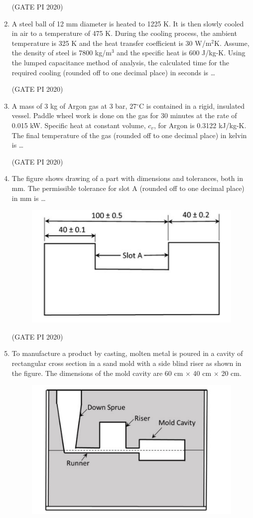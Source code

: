 \documentclass[journal,12pt,onecolumn]{IEEEtran}
\theoremstyle{remark}
\begin{document}
\begin{enumerate}
\hfill (GATE PI 2020)

\item A steel ball of 12 mm diameter is heated to 1225 K. It is then slowly cooled in air to a temperature of 475 K. During the cooling process, the ambient temperature is 325 K and the heat transfer coefficient is 30 W/m$^2$K. Assume, the density of steel is 7800 kg/m$^3$ and the specific heat is 600 J/kg-K. Using the lumped capacitance method of analysis, the calculated time for the required cooling (rounded off to one decimal place) in seconds is \dots 

\hfill (GATE PI 2020)

\item A mass of 3 kg of Argon gas at 3 bar, 27$^\circ$C is contained in a rigid, insulated vessel. Paddle wheel work is done on the gas for 30 minutes at the rate of 0.015 kW. Specific heat at constant volume, $c_v$, for Argon is 0.3122 kJ/kg-K. The final temperature of the gas (rounded off to one decimal place) in kelvin is \dots 

\hfill (GATE PI 2020)

\item The figure shows drawing of a part with dimensions and tolerances, both in mm. The permissible tolerance for slot A (rounded off to one decimal place) in mm is \dots 
\begin{figure}[h]
    \centering
    \includegraphics[width=0.5\columnwidth]{figs/fig15.png}
    \caption{}
    \label{fig:placeholder}
\end{figure}

\hfill (GATE PI 2020)

\item To manufacture a product by casting, molten metal is poured in a cavity of rectangular cross section in a sand mold with a side blind riser as shown in the figure. The dimensions of the mold cavity are 60 cm $\times$ 40 cm $\times$ 20 cm.

\begin{figure}[h]
    \centering
    \includegraphics[width=0.5\columnwidth]{figs/fig16.png}
    \caption{}
    \label{fig:placeholder}
\end{figure}


\end{enumerate}
\end{document}
